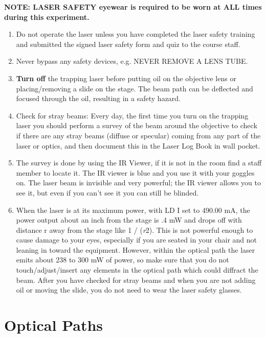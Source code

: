 \documentclass{../lab}
\begin{document}
\textbf{NOTE: LASER  SAFETY eyewear is required to be worn at ALL times during this experiment.}

\begin{enumerate}
    \item Do not operate the laser unless you have completed the laser safety training and submitted the signed laser safety form and quiz to the course staff.

    \item Never bypass any safety devices, e.g. NEVER REMOVE A LENS TUBE.

    \item \textbf{Turn off} the trapping laser before putting oil on the objective lens or placing/removing a slide on the stage. The beam path can be deflected and focused through the oil, resulting in a safety hazard.

    \item Check for stray beams: Every day, the first time you turn on the trapping laser you should perform a survey of the beam around the objective to check if there are any stray beams (diffuse or specular) coming from any part of the laser or optics, and then document this in the Laser Log Book in wall pocket.

    \item The survey is done by using the IR Viewer, if it is not in the room find a staff member to locate it. The IR viewer is blue and you use it with your goggles on. The laser beam is invisible and very powerful; the IR viewer allows you to see it, but even if you can't see it you can still be blinded.

    \item When the laser is at its maximum power, with LD I set to 490.00 mA, the power output about an inch from the stage is .4 mW and drops off with distance r away from the stage like 1 / (\emph{r}2). This is not powerful enough to cause damage to your eyes, especially if you are seated in your chair and not leaning in toward the equipment. However, within the optical path the laser emits about 238 to 300 mW of power, so make sure that you do not touch/adjust/insert any elements in the optical path which could diffract the beam. After you have checked for stray beams and when you are not adding oil or moving the slide, you do not need to wear the laser safety glasses.

\end{enumerate}

\section{Optical Paths}
\end{document}
